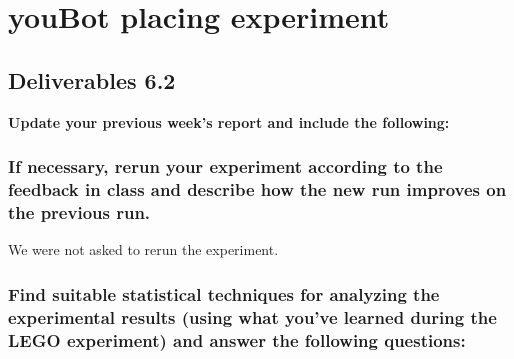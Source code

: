 \chapter{youBot placing experiment}
\section{Deliverables 6.2}
\textbf{Update your previous week’s report and include the following:}

\subsection{If necessary, rerun your experiment according to the feedback in class and describe how the new run improves on the previous run.}
We were not asked to rerun the experiment.

\subsection{Find suitable statistical techniques for analyzing the experimental results (using what you’ve learned during the LEGO experiment) and answer the following questions:}


